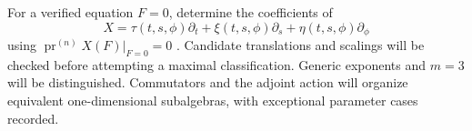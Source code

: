 \documentclass[12pt,a4paper]{article}
\newcommand{\pr}{\operatorname{pr}}
\begin{document}
For a verified equation $F=0$, determine the coefficients of
\begin{equation}
X=\tau(t,s,\phi)\partial_t+\xi(t,s,\phi)\partial_s
  +\eta(t,s,\phi)\partial_\phi
\end{equation}
using $\pr^{(n)}X(F)|_{F=0}=0$ \cite{olver}. Candidate translations and scalings will be checked before attempting a maximal classification. Generic exponents and $m=3$ will be distinguished. Commutators and the adjoint action will organize equivalent one-dimensional subalgebras, with exceptional parameter cases recorded.
\end{document}
